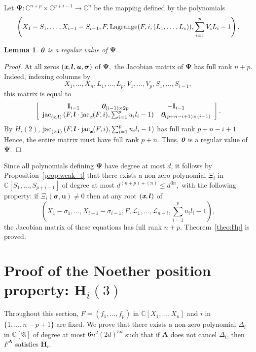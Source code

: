 \documentclass[a4paper]{article}
\def\sL{\mathscr{L}}
\def\A{\mathfrak{A}}
\def\bz{\textit{\textbf{0}}}
\def\mA{{\bm A}}
\def\ub{{\bm u}}
\def\lb{{\bm l}}
\def\xb{\textit{\textbf{x}}}
\def\bI{\textbf{I}}
\def\D{\Delta}
\DeclareMathOperator{\jac}{jac}
\DeclareMathOperator{\lag}{Lagrange}
\def\C{\mathbb{C}}
\def\lagF{{\bm\lag}(F,i,(L_1,\hdots,L_c))}
\def\udl{\sum_{i=1}^pu_il_i}
\def\Vdl{\sum_{i=1}^pV_iL_i}
\newtheorem{lemma}[theorem]{Lemma}
\begin{document}
\smallskip

Let $\bm\Psi: \C^{n+p} \times \C^{p+i-1} \rightarrow \C^{n}$ be the mapping defined by the polynomials
\[
  \left(X_1-S_1,\dots,X_{i-1}-S_{i-1},F,\lagF,\Vdl-1\right).
\]
%
\begin{lemma}
  $\bz$ is a regular value of $\bm\Psi.$
\end{lemma}
\begin{proof}
At all zeros $(\xb,\lb,\ub,\bm \sigma)$ of $\bm\Psi,$ the Jacobian matrix of
$\bm\Psi$ has full rank $n+p$. Indeed, indexing columns 
    by 
    \[
    X_1,\dots,X_n,L_1,\hdots,L_p,V_1,\hdots,V_p,S_1,\dots,S_{i-1},
    \]
    this matrix is equal to
    \[
    \left[ 
    \begin{array}{ccc}
    \bI_{i-1}\hspace{11mm} \bz_{(i-1)\times 2p}&\hspace{-10mm}-\bI_{i-1}\\
    \jac_{(\xb,\bm l)}\left( F,\lb \cdot \jac_{\xb} (F,i),\udl-1  \right)&\bz_{(p+n-i+1)\times (i-1)}
    \end{array}
    \right].
    \]
    By $H_i(2)$, $\jac_{(\xb,\bm l)}\left( F,\lb \cdot \jac_{\xb} (F,i), \udl-1 \right)$ has full rank $p+n-i+1$. Hence, the entire    
    matrix must have full rank $p+n$. Thus,  $\bz$ is a regular value of $\bm\Psi.$
    \end{proof}

Since all polynomials defining $\bm\Psi$ have degree at most $d$, it
follows by Proposition~\ref{prop:weak_t} that there exists a non-zero
polynomial $\Xi_i$ in $\C[S_1,\dots,S_{p+i-1}]$ of degree at most
$d^{(n+p)+(n)}\leq d^{3n},$ with the following property:  if $\Xi_i(\bm \sigma, \ub)\neq 0$ then at any root $(\xb,\lb)$ of
\[
\left(X_1-\sigma_1,\dots,X_{i-1}-\sigma_{i-1},F,\sL_1,\hdots,\sL_{n-i},\udl-1\right),
\] 
  the Jacobian matrix of these
equations has full rank $n+p$. Theorem~\ref{theo:Hp} is proved.




\section{Proof of the Noether position property: $\textbf{H}_i(3)$}\label{ssec:Hi2}
Throughout this section, $F = (f_1,\hdots,f_p)$ in $\C[X_1,\hdots,X_n]$ and $i$ in $\{1,\hdots,n-p+1\}$ are fixed. We prove that there exists a non-zero polynomial $\D_{i}$ in $\C[\A]$ of degree at most $6n^2(2d)^{5n}$ such that if $\mA$ does not cancel $\D_{i}$, then $F^{\mA}$ satisfies  $\textbf{H}_i$.
\end{document}
